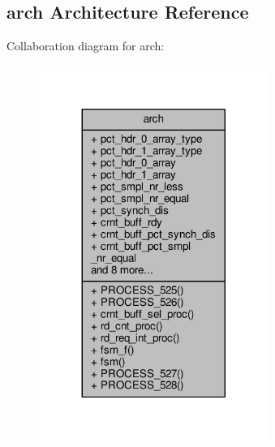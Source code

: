 \subsection{arch Architecture Reference}
\label{classp2d__rd_1_1arch}


Collaboration diagram for arch\+:\nopagebreak
\begin{figure}[H]
\begin{center}
\leavevmode
\includegraphics[width=212pt]{d2/d8e/classp2d__rd_1_1arch__coll__graph}
\end{center}
\end{figure}
